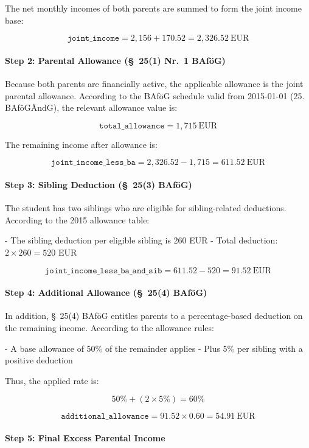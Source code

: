 The net monthly incomes of both parents are summed to form the joint income base:

\[
\texttt{joint\_income} = 2{,}156 + 170.52 = 2{,}326.52~\text{EUR}
\]

\paragraph{Step 2: Parental Allowance (§~25(1) Nr.~1 BAföG)}

Because both parents are financially active, the applicable allowance is the joint parental allowance. According to the BAföG schedule valid from 2015-01-01 (25. BAföGÄndG), the relevant allowance value is:

\[
\texttt{total\_allowance} = 1{,}715~\text{EUR}
\]

The remaining income after allowance is:

\[
\texttt{joint\_income\_less\_ba} = 2{,}326.52 - 1{,}715 = 611.52~\text{EUR}
\]

\paragraph{Step 3: Sibling Deduction (§~25(3) BAföG)}

The student has two siblings who are eligible for sibling-related deductions. According to the 2015 allowance table:

- The sibling deduction per eligible sibling is 260 EUR
- Total deduction: $2 \times 260 = 520$ EUR

\[
\texttt{joint\_income\_less\_ba\_and\_sib} = 611.52 - 520 = 91.52~\text{EUR}
\]

\paragraph{Step 4: Additional Allowance (§~25(4) BAföG)}

In addition, §~25(4) BAföG entitles parents to a percentage-based deduction on the remaining income. According to the allowance rules:

- A base allowance of 50\% of the remainder applies
- Plus 5\% per sibling with a positive deduction

Thus, the applied rate is:

\[
50\% + (2 \times 5\%) = 60\%
\]

\[
\texttt{additional\_allowance} = 91.52 \times 0.60 = 54.91~\text{EUR}
\]

\paragraph{Step 5: Final Excess Parental Income}

